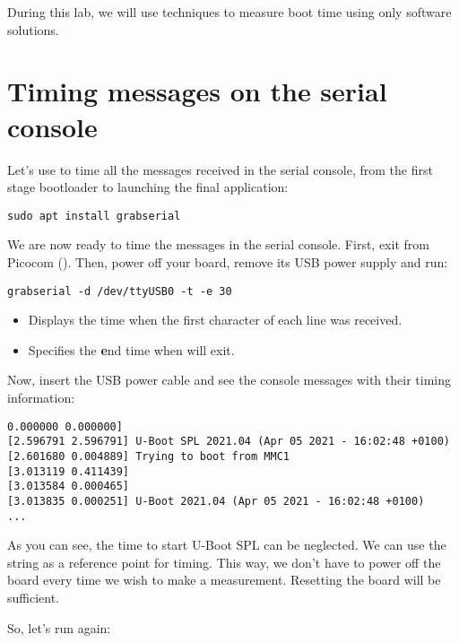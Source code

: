 
During this lab, we will use techniques to measure boot time using only
software solutions.

\section{Timing messages on the serial console}

Let's use  to time all the messages received in the
serial console, from the first stage bootloader to launching the final
application:

\begin{verbatim}
sudo apt install grabserial
\end{verbatim}

We are now ready to time the messages in the serial console. First, exit
from Picocom (\code{[Ctrl][a] [Ctrl][x]}). Then, power off your board,
remove its USB power supply and run:

\begin{verbatim}
grabserial -d /dev/ttyUSB0 -t -e 30
\end{verbatim}

\begin{itemize}
\item {} Displays the time when the first character of each line
was received.
\item {} Specifies the {\bf e}nd time when 
will exit.
\end{itemize}

Now, insert the USB power cable and see the console messages with their
timing information:

\begin{verbatim}
0.000000 0.000000]
[2.596791 2.596791] U-Boot SPL 2021.04 (Apr 05 2021 - 16:02:48 +0100)
[2.601680 0.004889] Trying to boot from MMC1
[3.013119 0.411439]
[3.013584 0.000465]
[3.013835 0.000251] U-Boot 2021.04 (Apr 05 2021 - 16:02:48 +0100)
...
\end{verbatim}

As you can see, the time to start U-Boot SPL can be neglected. We can
use the  string as a reference point for timing. This way,
we don't have to power off the board every time we wish to make a
measurement. Resetting the board will be sufficient.

So, let's run  again:

